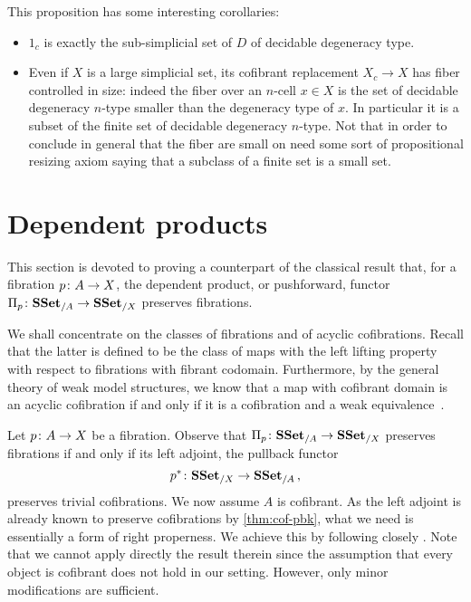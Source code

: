 \documentclass[reqno,10pt,a4paper,oneside,draft]{amsart}
\begin{document}
This proposition has some interesting corollaries:

\begin{itemize}

\item $1_c$ is exactly the sub-simplicial set of $D$ of decidable degeneracy type.

\item Even if $X$ is a large simplicial set, its cofibrant replacement $X_c \rightarrow X$ has fiber controlled in size: indeed the fiber over an $n$-cell $x \in X$ is the set of decidable degeneracy $n$-type smaller than the degeneracy type of $x$. In particular it is a subset of the finite set of decidable degeneracy $n$-type. Not that in order to conclude in general that the fiber are small on need some sort of propositional resizing axiom saying that a subclass of a finite set is a small set.

\end{itemize}

\newpage

\section{Dependent products}

This section is devoted to proving a counterpart of the classical result that, for a fibration $p \colon A \rightarrow X$, the dependent product, or pushforward, functor $\Pi_p \colon \mathbf{SSet}_{/A} \to \mathbf{SSet}_{/X}$ preserves fibrations. 

\medskip

We shall concentrate on the classes of fibrations and of acyclic cofibrations. 
Recall that the latter is defined to be the class of maps with the left lifting property
with respect to fibrations with fibrant codomain. Furthermore, by the general theory of weak model
structures, we know that a map with cofibrant domain is an acyclic cofibration if and only if it is a cofibration
and a weak equivalence~\cite[Proposition~2.2.9]{henry2018wms}.  

\medskip

Let $p \colon A \rightarrow X$ be a fibration. Observe that $\Pi_p \colon \mathbf{SSet}_{/A} \to \mathbf{SSet}_{/X}$  preserves fibrations if and only if its left adjoint, the pullback functor
\[
p^* \colon \mathbf{SSet}_{/X} \to \mathbf{SSet}_{/A} \, , 
\]
preserves trivial cofibrations. We now assume  $A$ is cofibrant. 
As the left adjoint is already known to preserve cofibrations by \cref{thm:cof-pbk}, what we need is essentially a form of right properness. We achieve this by following closely \cite[Section~3]{gambino2017frobenius}. Note that we cannot apply directly the result therein since 
the assumption that every object is cofibrant does not hold in our setting. However, only minor modifications are sufficient.
\end{document}
